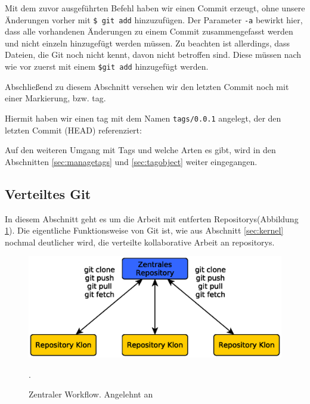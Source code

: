 Mit dem zuvor ausgeführten Befehl haben wir einen Commit erzeugt, ohne unsere
Änderungen vorher mit \texttt{\$ git add} hinzuzufügen. Der Parameter
\texttt{-a} bewirkt hier, dass alle vorhandenen Änderungen zu einem Commit
zusammengefasst werden und nicht einzeln hinzugefügt werden müssen. Zu beachten
ist allerdings, dass Dateien, die Git noch nicht kennt, davon nicht betroffen
sind. Diese müssen nach wie vor zuerst mit einem \texttt{\$git add} hinzugefügt
werden.

Abschließend zu diesem Abschnitt versehen wir den letzten Commit noch mit einer
Markierung, bzw. \gls{tag}.



Hiermit haben wir einen \gls{tag} mit dem Namen \texttt{tags/0.0.1} angelegt,
der den letzten Commit (\gls{HEAD}) referenziert:



Auf den weiteren Umgang mit Tags und welche Arten es gibt, wird in den
Abschnitten \ref{sec:managetags} und \ref{sec:tagobject} weiter eingegangen.

\subsection{Verteiltes Git}\label{sec:distributed}
In diesem Abschnitt geht es um die Arbeit mit entferten Repositorys(Abbildung
\ref{fig:centralworkflow}). Die eigentliche Funktionsweise von Git ist, wie
aus Abschnitt \ref{sec:kernel} nochmal deutlicher wird, die verteilte
kollaborative Arbeit an \glspl{repository}.

\begin{figure}[h]
  \centering
  \includegraphics[scale=0.70]{images/workflow.eps}
  \caption{Zentraler Workflow. Angelehnt an \cite[S.~138]{gitosp}}.
  \label{fig:centralworkflow}
\end{figure}

